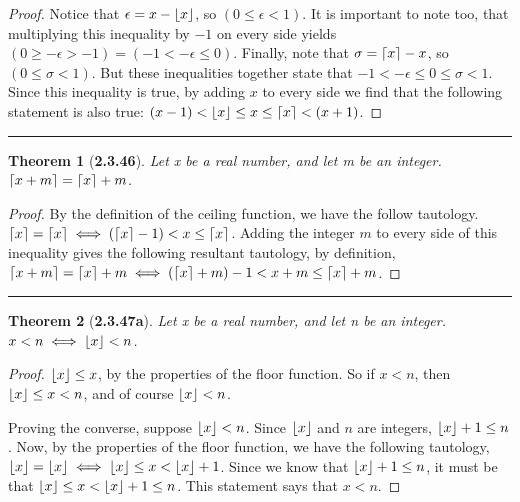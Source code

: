 \documentclass[a4paper, 12pt]{article}
\theoremstyle{plain}
\newtheorem*{theorem*}{Theorem}
\DeclarePairedDelimiter{\floor}{\lfloor}{\rfloor}
\DeclarePairedDelimiter{\ceil}{\lceil}{\rceil}
\begin{document}
\begin{proof}
    Notice that $\epsilon = x - \floor{x}$, so $(0 \le \epsilon < 1)$. It is important to note 
    too, that multiplying this inequality by $-1$ on every side yields 
    $(0 \ge -\epsilon > -1) = (-1 < -\epsilon \le 0)$. Finally, note that 
    $\sigma = \ceil{x} - x$, so $(0 \le \sigma < 1)$. But these inequalities together state 
    that $-1 < -\epsilon \le 0 \le \sigma < 1$. Since this inequality is true, by adding $x$ to 
    every side we find that the following statement is also true: 
    $(x - 1) < \floor{x} \le x \le \ceil{x} < (x + 1)$.
\end{proof}
\begin{center}
    \rule{5.4in}{1pt}
\end{center}


\begin{theorem*}[\textbf{2.3.46}]
    Let x be a real number, and let m be an integer. \newline $\ceil{x + m} = \ceil{x} + m$.
\end{theorem*}

\begin{proof}
    By the definition of the ceiling function, we have the follow tautology.
    $\ceil{x} = \ceil{x} \iff (\ceil{x} - 1) < x \le \ceil{x}$. \newline Adding the integer 
    $m$ to every side of this inequality gives the following resultant tautology, by 
    definition, \newline
    $\ceil{x + m} = \ceil{x} + m \iff (\ceil{x} + m) - 1 < x + m \le \ceil{x} + m$.
\end{proof}
\begin{center}
    \rule{5.4in}{1pt}
\end{center}


\begin{theorem*}[\textbf{2.3.47a}]
    Let x be a real number, and let n be an integer. \newline $x < n \iff \floor{x} < n$.
\end{theorem*}

\begin{proof}
    $\floor{x} \le x$, by the properties of the floor function. So if $x < n$, then 
    $\floor{x} \le x < n$, and of course $\floor{x} < n$.
    
    Proving the converse, suppose $\floor{x} < n$. Since $\floor{x}$ and $n$ are integers, 
    $\floor{x} + 1 \le n$. Now, by the properties of the floor function, we have the following 
    tautology, $\floor{x} = \floor{x} \iff \floor{x} \le x < \floor{x} + 1$. Since we know 
    that $\floor{x} + 1 \le n$, it must be that $\floor{x} \le x < \floor{x} + 1 \le n$. This 
    statement says that $x < n$.
\end{proof}
\end{document}
